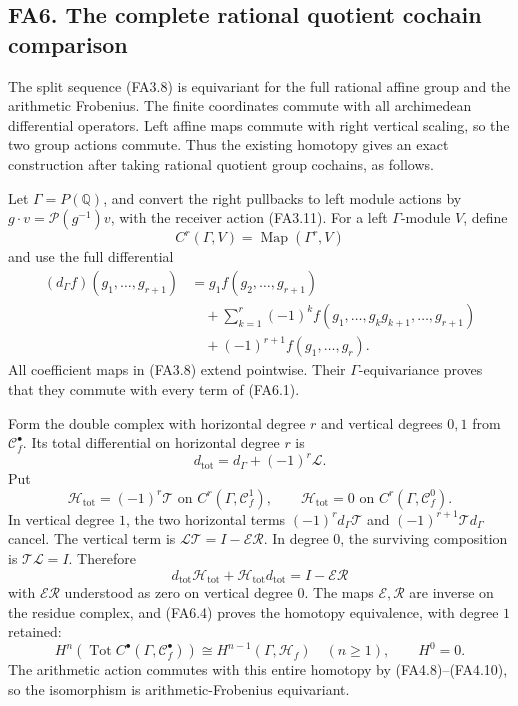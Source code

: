 \subsection{FA6. The complete rational quotient cochain
comparison}\label{fa6.-the-complete-rational-quotient-cochain-comparison}

The split sequence (FA3.8) is equivariant for the full rational affine
group and the arithmetic Frobenius. The finite coordinates commute with
all archimedean differential operators. Left affine maps commute with
right vertical scaling, so the two group actions commute. Thus the
existing homotopy gives an exact construction after taking rational
quotient group cochains, as follows.

Let \(\Gamma=P(\mathbb Q)\), and convert the right pullbacks to left
module actions by \(g\cdot v
=\mathcal P(g^{-1})v\), with the receiver action (FA3.11). For a left
\(\Gamma\)-module \(V\), define \[
 C^r(\Gamma,V)=\operatorname{Map}(\Gamma^r,V)
\] and use the full differential \[
 \begin{aligned}
 (d_\Gamma f)(g_1,\ldots,g_{r+1})
  &=g_1 f(g_2,\ldots,g_{r+1})\\
  &\quad+\sum_{k=1}^r(-1)^k
       f(g_1,\ldots,g_kg_{k+1},\ldots,g_{r+1})\\
  &\quad+(-1)^{r+1}f(g_1,\ldots,g_r).
 \end{aligned}
\tag{FA6.1}
\] All coefficient maps in (FA3.8) extend pointwise. Their
\(\Gamma\)-equivariance proves that they commute with every term of
(FA6.1).

Form the double complex with horizontal degree \(r\) and vertical
degrees \(0,1\) from \(\mathcal C_f^\bullet\). Its total differential on
horizontal degree \(r\) is \[
 d_{\mathrm{tot}}=d_\Gamma+(-1)^r\mathcal L.
\tag{FA6.2}
\] Put \[
 \mathcal H_{\mathrm{tot}}=(-1)^r\mathcal T
     \text{ on }C^r(\Gamma,\mathcal C_f^1),
 \qquad \mathcal H_{\mathrm{tot}}=0
     \text{ on }C^r(\Gamma,\mathcal C_f^0).
\tag{FA6.3}
\] In vertical degree \(1\), the two horizontal terms
\((-1)^r d_\Gamma\mathcal T\) and \((-1)^{r+1}\mathcal Td_\Gamma\)
cancel. The vertical term is
\(\mathcal L\mathcal T=I-\mathcal E\mathcal R\). In degree \(0\), the
surviving composition is \(\mathcal T\mathcal L=I\). Therefore \[
 d_{\mathrm{tot}}\mathcal H_{\mathrm{tot}}
   +\mathcal H_{\mathrm{tot}}d_{\mathrm{tot}}
       =I-\mathcal E\mathcal R
\tag{FA6.4}
\] with \(\mathcal E\mathcal R\) understood as zero on vertical degree
\(0\). The maps \(\mathcal E,\mathcal R\) are inverse on the residue
complex, and (FA6.4) proves the homotopy equivalence, with degree \(1\)
retained: \[
 H^n(\operatorname{Tot} C^\bullet
           (\Gamma,\mathcal C_f^\bullet))
       \cong H^{n-1}(\Gamma,\mathcal H_f)
       \quad(n\ge1),\qquad H^0=0.
\tag{FA6.5}
\] The arithmetic action commutes with this entire homotopy by
(FA4.8)--(FA4.10), so the isomorphism is arithmetic-Frobenius
equivariant.

